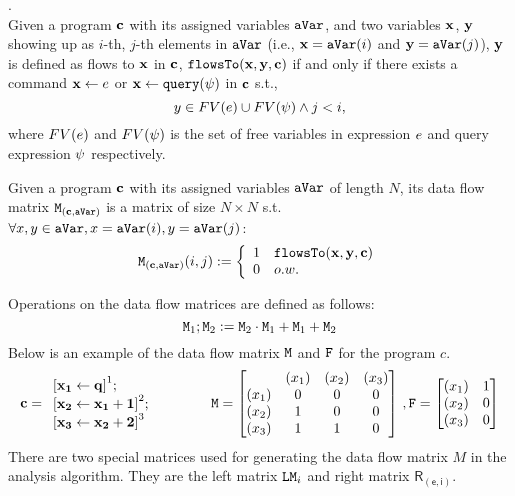 \documentclass[a4paper,11pt]{article}
\begin{document}
\begin{defn}.
\\
Given a program  $\mathbf{{c}}$ with its assigned variables $\mathtt{aVar}$,
and two variables $\mathbf{{x}}$, $\mathbf{{y}}$ showing up as $i$-th, $j$-th elements in $\mathtt{aVar}$ 
(i.e., $\mathbf{{x}} = \mathtt{aVar}(i)$ and $\mathbf{{y}} = \mathtt{aVar}(j)$),
$\mathbf{{y}}$ is defined as flows to $\mathbf{{x}}$ in $\mathbf{{c}}$, $\mathtt{flowsTo}(\mathbf{{x, y, c}})$ if and only if 
there exists
a command $\mathrel{ \mathbf{{x}} \leftarrow e }$ or $\mathrel{ \mathbf{{x}} \leftarrow {\tt query}(\psi) }$ in $\mathbf{{c}}$ s.t.,
\[
	y \in FV(e) \cup FV(\psi) \land j < i,
\]
where $FV(e)$ and $FV(\psi)$ is the set of free variables in 
expression $e$ and query expression $\psi$ respectively.
\end{defn}
%
%
\begin{defn}
Given a program  $\mathbf{{c}}$ with its assigned variables $\mathtt{aVar}$ of length $N$,
its data flow matrix $\mathtt{M}_{(\mathbf{{c}}, \mathtt{aVar})}$ is a matrix of size $N \times N$ s.t.
$\forall x, y \in \mathtt{aVar}, x = \mathtt{aVar}(i), y = \mathtt{aVar}(j)$:
%
\[
\Mtrix_{(\ssa{c}, \avar)}(i, j) :=
\left\{
\begin{array}{ll}
1	&	\flowsto(\ssa{x, y, c}) \\
0	& o.w.
\end{array}
\right.
\]
%
\end{defn}
%
Operations on the data flow matrices are defined as follows:
%
\begin{equation}
\mathtt{M}_1 ; \mathtt{M}_2 
:= \mathtt{M}_2 \cdot \mathtt{M}_1 + \mathtt{M}_1 + \mathtt{M}_2
\end{equation}
%
Below is an example of the data flow matrix $\mathtt{M}$ and $\mathtt{F}$ for the program $c$.
$$
\ssa{c} = 
\begin{array}{l}
\left[\ssa{\assign {x_1} {q}}		\right]^1;
\\
\left[\ssa{\assign {x_2} {x_1 + 1}}	\right]^2;
\\
\left[\ssa{\assign {x_3} {x_2 + 2}}	\right]^3
\end{array}
~~~~~~~~~~~~
\Mtrix
=  \left[ 
\begin{matrix}
 & (x_1) & (x_2) & (x_3) \\
(x_1) & 0 & 0 & 0 \\
(x_2) & 1 & 0 & 0 \\
(x_3) & 1 & 1 & 0 \\
\end{matrix} \right] ~ , 
\flag = \left [ \begin{matrix}
(x_1) &  1 \\
(x_2) & 0 \\
(x_3) & 0 \\
\end{matrix} \right ]
$$
%
There are two special matrices used for generating the data flow matrix $M$ in the analysis algorithm. They are the left matrix $\mathtt{LM}_i$ and right matrix $\mathsf{R_{(e, i)}}$.
\end{document}
